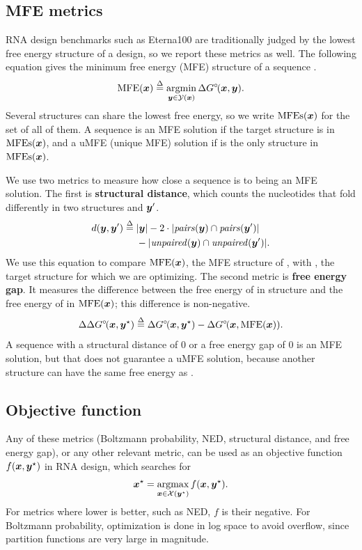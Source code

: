 \subsection{MFE metrics}\label{sec:mfe}
RNA design benchmarks such as Eterna100 are traditionally judged by the lowest free energy structure of a design, so we report these metrics as well. The following equation gives the minimum free energy (MFE) structure of a sequence \vecx.
\begin{equation}
\MFE(\vecx)\defeq\argmin_{\vecy\in\GEN(\vecx)}\freeenergy(\vecx,\vecy).
\end{equation}
Several structures can share the lowest free energy, so we write $\text{MFEs}(\boldsymbol{{x}})$ for the set of all of them. A sequence \vecx is an MFE solution if the target structure \vecystar is in $\text{MFEs}(\boldsymbol{{x}})$, and a uMFE (unique MFE) solution if \vecystar is the only structure in $\text{MFEs}(\boldsymbol{{x}})$.

We use two metrics to measure how close a sequence is to being an MFE solution. The first is  {\bf structural distance}, which counts the nucleotides that fold differently in two structures \vecy and $\boldsymbol{{y}}'$.
\begin{equation}
\begin{aligned}
d(\boldsymbol{{y}},\boldsymbol{{y}}')\stackrel{\Delta}{=}{}&|\boldsymbol{{y}}|-2\cdot|\mathit{pairs}(\boldsymbol{{y}})\cap\mathit{pairs}(\boldsymbol{{y}}')|\\
&-|\mathit{unpaired}(\boldsymbol{{y}})\cap\mathit{unpaired}(\boldsymbol{{y}}')|.
\end{aligned}
\label{eq:dist}
\end{equation}
We use this equation to compare $\text{MFE}(\boldsymbol{{x}})$, the MFE structure of \vecx, with \vecystar, the target structure for which we are optimizing. The second metric is  {\bf free energy gap}. It measures the difference between the free energy of \vecx in structure \vecystar and the free energy of \vecx in $\text{MFE}(\boldsymbol{{x}})$; this difference is non-negative.
\begin{equation}
\Delta \Delta\,\! G^{\scriptstyle\circ\!}(\boldsymbol{{x}},\boldsymbol{{y}}^\star)\stackrel{\Delta}{=}\Delta\,\! G^{\scriptstyle\circ\!}(\boldsymbol{{x}},\boldsymbol{{y}}^\star)-\Delta\,\! G^{\scriptstyle\circ\!}(\boldsymbol{{x}},\text{MFE}(\boldsymbol{{x}})).
\label{eq:ddg}
\end{equation}
A sequence with a structural distance of 0 or a free energy gap of 0 is an MFE solution, but that does not guarantee a uMFE solution, because another structure can have the same free energy as \vecystar.

\subsection{Objective function}\label{sec:statement}
Any of these metrics (Boltzmann probability, NED, structural distance, and free energy gap), or any other relevant metric, can be used as an objective function $f(\boldsymbol{{x}},\boldsymbol{{y}}^\star)$ in
RNA design, which searches for
\begin{equation}
\vecxstar=\argmax_{\vecx\in\GENX(\vecystar)}f(\vecx,\vecystar).
\label{eq:design}
\end{equation}
For metrics where lower is better, such as NED, $f$ is their negative. For Boltzmann probability, optimization is  done in log space to avoid overflow, since partition functions are very large in magnitude.
